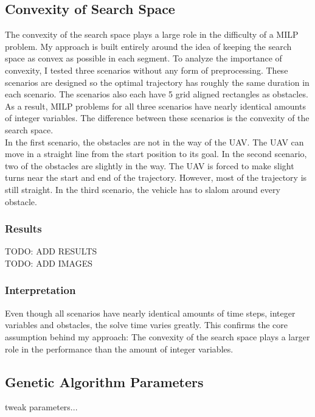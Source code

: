 \subsection{Convexity of Search Space}
The convexity of the search space plays a large role in the difficulty of a MILP problem. My approach is built entirely around the idea of keeping the search space as convex as possible in each segment. To analyze  the importance of convexity, I tested three scenarios without any form of preprocessing. These scenarios are designed so the optimal trajectory has roughly the same duration in each scenario. The scenarios also each have 5 grid aligned rectangles as obstacles.\\
As a result, MILP problems for all three scenarios have nearly identical amounts of integer variables. The difference between these scenarios is the convexity of the search space. \\
In the first scenario, the obstacles are not in the way of the UAV. The UAV can move in a straight line from the start position to its goal. In the second scenario, two of the obstacles are slightly in the way. The UAV is forced to make slight turns near the start and end of the trajectory. However, most of the trajectory is still straight. In the third scenario, the vehicle has to slalom around every obstacle.\\

\subsubsection{Results}
TODO: ADD RESULTS\\
TODO: ADD IMAGES \\
\subsubsection{Interpretation}
Even though all scenarios have nearly identical amounts of time steps, integer variables and obstacles, the solve time varies greatly. This confirms the core assumption behind my approach: The convexity of the search space plays a larger role in the performance than the amount of integer variables.





\subsection{Genetic Algorithm Parameters}
tweak parameters...




